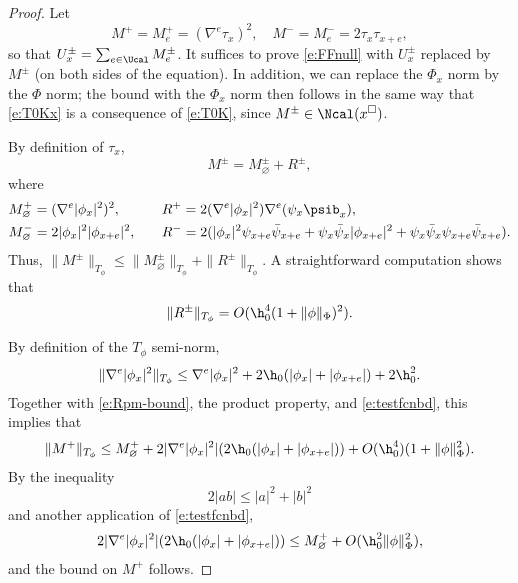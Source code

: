 \begin{proof}
Let
\begin{equation}
M^+ = M^+_e = (\nabla^e \tau_x)^2,
\quad
M^- = M^-_e = 2 \tau_x \tau_{x+e},
\end{equation}
so that $U^\pm_x = \sum_{e\in\Ucal} M^\pm_e$.
It suffices to prove \eqref{e:FFnull} with $U^\pm_x$ replaced by $M^\pm$
(on both sides of the equation).
In addition, we can replace the $\Phi_x$ norm by the $\Phi$ norm;
the bound with the $\Phi_x$ norm then follows in the same way that \eqref{e:T0Kx} is a consequence of \eqref{e:T0K},
since $M^\pm \in \Ncal(x^\Box)$.

By definition of $\tau_x$,
\begin{equation}
M^\pm = M^\pm_{\varnothing} + R^\pm,
\end{equation}
where
\begin{alignat}{2}
&M^+_{\varnothing} = (\nabla^e |\phi_x|^2)^2,
  \quad
&&R^+ = 2 (\nabla^e |\phi_x|^2) \nabla^e (\psi_x\psib_x),
  \\
&M^-_\varnothing = 2 |\phi_x|^2 |\phi_{x+e}|^2,
  \quad
&&R^- = 2 (|\phi_x|^2 \psi_{x+e}\bar\psi_{x+e}
+ \psi_x\bar\psi_x |\phi_{x+e}|^2 + \psi_x\bar\psi_x\psi_{x+e}\bar\psi_{x+e}).
\end{alignat}
Thus, $\|M^\pm\|_{T_\phi} \leq \|M^\pm_{\varnothing}\|_{T_\phi} + \|R^\pm\|_{T_\phi}$.
A straightforward computation shows that
\begin{equation}
\label{e:Rpm-bound}
\|R^\pm\|_{T_\phi} = O(\h_0^4 (1 + \|\phi\|_\Phi)^2).
\end{equation}

By definition of the $T_\phi$ semi-norm,
\begin{equation}
\label{e:nabla-phi-sq-bd}
\|\nabla^e |\phi_x|^2\|_{T_\phi}
  \le
\nabla^e |\phi_x|^2 + 2 \h_0 (|\phi_x| + |\phi_{x+e}|) + 2 \h_0^2.
\end{equation}
Together with \eqref{e:Rpm-bound}, the product property,
and \eqref{e:testfcnbd}, this implies that
\begin{equation}
\|M^+\|_{T_\phi}
  \le
M^+_\varnothing
  + 2 |\nabla^e |\phi_x|^2| (2 \h_0 (|\phi_x| + |\phi_{x+e}|))
  + O(\h_0^4) (1 + \|\phi\|^2_\Phi).
\end{equation}
By the inequality
\begin{equation}
\label{e:young-ineq}
2|ab| \le |a|^2 + |b|^2
\end{equation}
and another application of \eqref{e:testfcnbd},
\begin{equation}
2 |\nabla^e |\phi_x|^2| (2 \h_0 (|\phi_x| + |\phi_{x+e}|))
  \le
M^+_\varnothing + O(\h_0^2 \|\phi\|^2_\Phi),
\end{equation}
and the bound on $M^+$ follows.


\end{proof}
